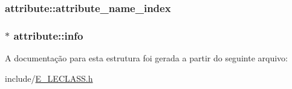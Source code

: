 \subsubsection[{attribute\+\_\+name\+\_\+index}]{ attribute\+::attribute\+\_\+name\+\_\+index}\label{structattribute_a55761ad4a2ed18b8f88baf6ac062cb46}
\hypertarget{structattribute_ac749b125ccc9eda0cfe9deb4fe4aeda9}{}
\subsubsection[{info}]{$\ast$ attribute\+::info}\label{structattribute_ac749b125ccc9eda0cfe9deb4fe4aeda9}


A documentação para esta estrutura foi gerada a partir do seguinte arquivo\+:\begin{DoxyCompactItemize}
\item 
include/\hyperlink{_e___l_e_c_l_a_s_s_8h}{E\+\_\+\+L\+E\+C\+L\+A\+S\+S.\+h}\end{DoxyCompactItemize}
